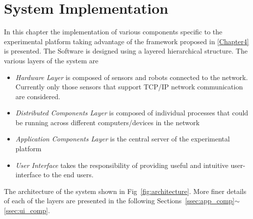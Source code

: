 
\chapter{System Implementation} %

\label{Chapter5} %

In this chapter the implementation of various components specific to the experimental platform taking advantage of the framework proposed in \ref{Chapter4} is presented. The Software is designed using a layered hierarchical structure. The various layers of the system are
\begin{itemize}
\item \emph{Hardware Layer} is composed of sensors and robots connected to the network. Currently only those sensors that support TCP/IP network communication are considered.
\item \emph{Distributed Components Layer} is composed of individual processes that could be running across different computers/devices in the network
\item \emph{Application Components Layer} is the central server of the experimental platform
\item \emph{User Interface} takes the responsibility of providing useful and intuitive user-interface to the end users.
\end{itemize}
The architecture of the system shown in Fig~\ref{fig:architecture}. More finer details of each of the layers are presented in the following Sections~\ref{ssec:app_comp}$\sim$\ref{ssec:ui_comp}.
